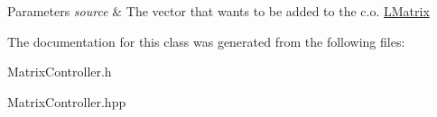 \begin{DoxyParams}{Parameters}
{\em source} & The vector that wants to be added to the c.\+o. \mbox{\hyperlink{class_l_matrix}{L\+Matrix}} \\
\hline
\end{DoxyParams}


The documentation for this class was generated from the following files\+:\begin{DoxyCompactItemize}
\item 
Matrix\+Controller.\+h\item 
Matrix\+Controller.\+hpp\end{DoxyCompactItemize}
